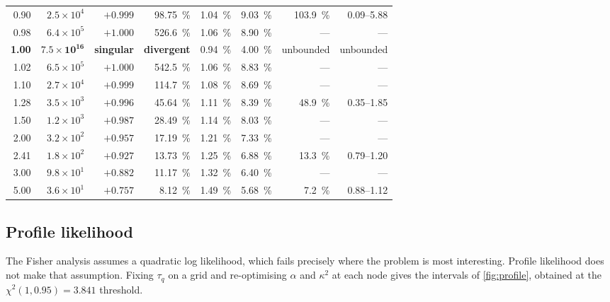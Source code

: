 \documentclass[preprint,12pt,a4paper]{elsarticle}
\theoremstyle{plain}
\theoremstyle{definition}
\theoremstyle{remark}
\newcommand{\tq}{\tau_{q}}
\newcommand{\kk}{\kappa^{2}}
\begin{document}
\begin{table}[htbp]
\begin{tabular}{@{}rrrrrrrr@{}}
    0.90 & $2.5\times10^{4}$  & $+0.999$ & \SI{98.75}{\percent} & \SI{1.04}{\percent} & \SI{9.03}{\percent} & \SI{103.9}{\percent} & 0.09--5.88 \\
    0.98 & $6.4\times10^{5}$  & $+1.000$ & \SI{526.6}{\percent} & \SI{1.06}{\percent} & \SI{8.90}{\percent} & --- & --- \\
    \textbf{1.00} & $\mathbf{7.5\times10^{16}}$ & \textbf{singular} &
      \textbf{divergent} & \SI{0.94}{\percent} & \SI{4.00}{\percent} &
      unbounded & unbounded \\
    1.02 & $6.5\times10^{5}$  & $+1.000$ & \SI{542.5}{\percent} & \SI{1.06}{\percent} & \SI{8.83}{\percent} & --- & --- \\
    1.10 & $2.7\times10^{4}$  & $+0.999$ & \SI{114.7}{\percent} & \SI{1.08}{\percent} & \SI{8.69}{\percent} & --- & --- \\
    1.28 & $3.5\times10^{3}$  & $+0.996$ & \SI{45.64}{\percent} & \SI{1.11}{\percent} & \SI{8.39}{\percent} & \SI{48.9}{\percent} & 0.35--1.85 \\
    1.50 & $1.2\times10^{3}$  & $+0.987$ & \SI{28.49}{\percent} & \SI{1.14}{\percent} & \SI{8.03}{\percent} & --- & --- \\
    2.00 & $3.2\times10^{2}$  & $+0.957$ & \SI{17.19}{\percent} & \SI{1.21}{\percent} & \SI{7.33}{\percent} & --- & --- \\
    2.41 & $1.8\times10^{2}$  & $+0.927$ & \SI{13.73}{\percent} & \SI{1.25}{\percent} & \SI{6.88}{\percent} & \SI{13.3}{\percent} & 0.79--1.20 \\
    3.00 & $9.8\times10^{1}$  & $+0.882$ & \SI{11.17}{\percent} & \SI{1.32}{\percent} & \SI{6.40}{\percent} & --- & --- \\
    5.00 & $3.6\times10^{1}$  & $+0.757$ & \SI{8.12}{\percent}  & \SI{1.49}{\percent} & \SI{5.68}{\percent} & \SI{7.2}{\percent} & 0.88--1.12 \\
    \bottomrule
  \end{tabular}
\end{table}


\subsection{Profile likelihood}
\label{sec:prac-profile}

The Fisher analysis assumes a quadratic log likelihood, which fails precisely
where the problem is most interesting. Profile likelihood does not make that
assumption. Fixing $\tq$ on a grid and re-optimising $\alpha$ and $\kk$ at each
node gives the intervals of \cref{fig:profile}, obtained at the
$\chi^{2}(1,0.95)=3.841$ threshold.
\end{document}
